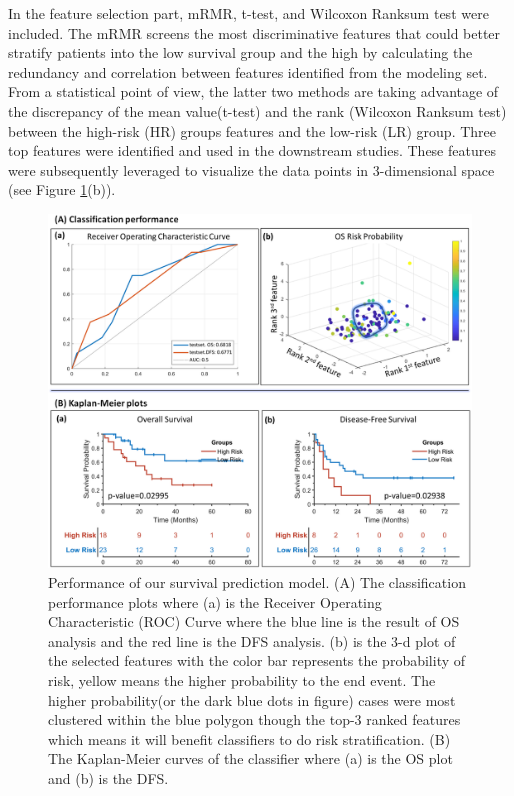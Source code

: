 \documentclass[num-refs]{wiley-article}
\begin{document}
In the feature selection part, mRMR\cite{peng2005feature}, t-test, and Wilcoxon Ranksum test were included. The mRMR screens the most discriminative features that could better stratify patients into the low survival group and the high by calculating the redundancy and correlation between features identified from the modeling set. From a statistical point of view, the latter two methods are taking advantage of the discrepancy of the mean value(t-test) and the rank (Wilcoxon Ranksum test) between the high-risk (HR) groups features and the low-risk (LR) group. Three top features were identified and used in the downstream studies. These features were subsequently leveraged to visualize the data points in 3-dimensional space (see Figure \ref{fig5}(b)).

\begin{figure}[h!]
\centering
\includegraphics[scale=0.22]{FIG/fig5.eps}
\caption{Performance of our survival prediction model. (A) The classification performance plots where (a) is the Receiver Operating Characteristic (ROC) Curve where the blue line is the result of OS analysis and the red line is the DFS analysis. (b) is the 3-d plot of the selected features with the color bar represents the probability of risk, yellow means the higher probability to the end event. The higher probability(or the dark blue dots in figure) cases were most clustered within the blue polygon though the top-3 ranked features which means it will benefit classifiers to do risk stratification. (B) The Kaplan-Meier curves of the classifier where (a) is the OS plot and (b) is the DFS.}
\label{fig5}
\end{figure}
\end{document}
